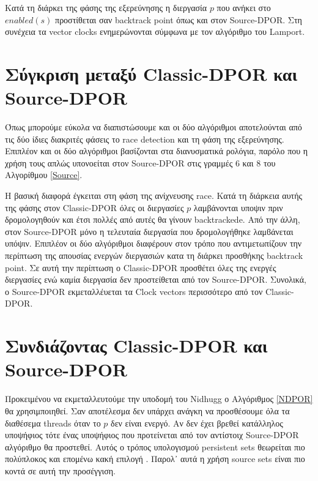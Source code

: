 Κατά τη διάρκει της φάσης της εξερεύνησης η διεργασία $p$ που ανήκει στο $enabled(s)$ προστίθεται σαν backtrack point όπως και στον Source-DPOR. 
Στη συνέχεια τα vector clocks ενημερώνονται σύμφωνα με τον αλγόριθμο του Lamport.

\section{Σύγκριση μεταξύ Classic-DPOR και Source-DPOR}

Όπως μπορούμε εύκολα να διαπιστώσουμε και οι δύο αλγόριθμοι αποτελούνται από τις δύο ίδιες διακριτές φάσεις το race detection και τη φάση της εξερεύνησης. Επιπλέον και οι 
δύο αλγόριθμοι βασίζονται στα διανυσματικά ρολόγια, παρόλο που η χρήση τους απλώς υπονοείται στον Source-DPOR στις γραμμές 6 και 8 του Αλγορίθμου \ref{Source}.

Η βασική διαφορά έγκειται στη φάση της ανίχνευσης race. Κατά τη διάρκεια αυτής της φάσης στον Classic-DPOR όλες οι διεργασίες $p$ λαμβάνονται υποψιν πριν δρομολογηθούν
και έτσι πολλές από αυτές θα γίνουν backtrackede. Από την άλλη, στον Source-DPOR μόνο η τελευταία διεργασία που δρομολογήθηκε 
λαμϐάνεται υπόψιν. Επιπλέον οι δύο αλγόριθμοι διαφέρουν στον τρόπο που αντιμετωπίζουν την περίπτωση της απουσίας ενεργών διεργασιών κατα τη διάρκει προσθήκης backtrack point.
Σε αυτή την περίπτωση ο Classic-DPOR προσθέτει όλες της ενεργές διεργασίες ενώ καμία διεργασία δεν προστείθεται από τον Source-DPOR.
Συνολικά, ο Source-DPOR εκμεταλλέυεται τα Clock vectors περισσότερο από τον Classic-DPOR.

\section{Συνδιάζοντας Classic-DPOR και Source-DPOR}

Προκειμένου να εκμεταλλευτούμε την υποδομή του Nidhugg ο Αλγόριθμος \ref{NDPOR} θα χρησιμποιηθεί. Σαν αποτέλεσμα δεν υπάρχει ανάγκη να προσθέσουμε όλα τα διαθέσεμα
threads όταν το $p$ δεν είναι ενεργό. Αν δεν έχει βρεθεί κατάλληλος υποψήφιος τότε
ένας υποψήφιος που προτείνεται από τον αντίστοιχ Source-DPOR αλγόριθμο θα προστεθεί. Αυτός ο τρόπος υπολογισμού persistent sets θεωρείται πιο πολύπλοκος και επομένω
κακή επιλογή \cite{Gode05}. Παρολ᾽ αυτά η χρήση source sets είναι πιο κοντά σε αυτή την προσέγγιση.

